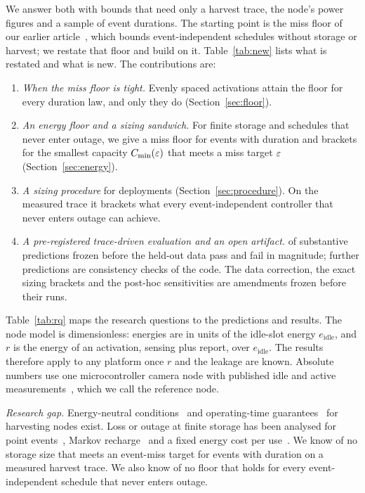 We answer both with bounds that need only a harvest trace, the node's power figures and a sample of event durations. The starting point is the miss floor of our earlier article~\cite[Thms.~4--5]{deep3_jiot2026}, which bounds event-independent schedules without storage or harvest; we restate that floor and build on it. Table~\ref{tab:new} lists what is restated and what is new. The contributions are:
\begin{enumerate}
\item \emph{When the miss floor is tight.} Evenly spaced activations attain the floor for every duration law, and only they do (Section~\ref{sec:floor}).
\item \emph{An energy floor and a sizing sandwich.} For finite storage and schedules that never enter outage, we give a miss floor for events with duration and brackets for the smallest capacity $C_{\min}(\varepsilon)$ that meets a miss target $\varepsilon$ (Section~\ref{sec:energy}).
\item \emph{A sizing procedure} for deployments (Section~\ref{sec:procedure}). On the measured trace it brackets what every event-independent controller that never enters outage can achieve.
\item \emph{A pre-registered trace-driven evaluation and an open artifact.} \nSubstPass{} of \nSubst{} substantive predictions frozen before the held-out data pass and \nSubstFail{} fail in magnitude; \nCons{} further predictions are consistency checks of the code. The data correction, the exact sizing brackets and the post-hoc sensitivities are amendments frozen before their runs.
\end{enumerate}
Table~\ref{tab:rq} maps the research questions to the predictions and results. The node model is dimensionless: energies are in units of the idle-slot energy $e_{\mathrm{idle}}$, and $r$ is the energy of an activation, sensing plus report, over $e_{\mathrm{idle}}$. The results therefore apply to any platform once $r$ and the leakage are known. Absolute numbers use one microcontroller camera node with published idle and active measurements~\cite{moosmann2025tinyissimo}, which we call the reference node.

\emph{Research gap.} Energy-neutral conditions~\cite{kansal2007,moser2007rts} and operating-time guarantees~\cite{fan2025tgcn} for harvesting nodes exist. Loss or outage at finite storage has been analysed for point events~\cite{zhang2013twc,ren2015p2p}, Markov recharge~\cite{deng2022arxiv,tunc2017peva} and a fixed energy cost per use~\cite{ballestrin2026cl}. We know of no storage size that meets an event-miss target for events with duration on a measured harvest trace. We also know of no floor that holds for every event-independent schedule that never enters outage.

